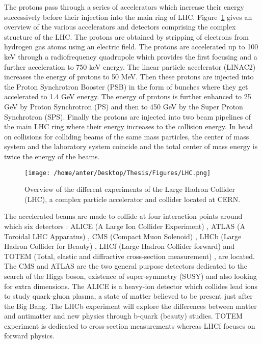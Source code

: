 The protons pass through a series of accelerators which increase their energy successively before their injection into the main ring of LHC. Figure~\ref{fig:LHC} gives an overview of the various accelerators and detectors comprising the complex structure of the LHC. The protons are obtained by stripping of electrons from hydrogen gas atoms using an electric field. The protons are accelerated up to 100 keV through a radiofrequency quadrupole which provides the first focusing and a further acceleration to 750 keV energy. The linear particle accelerator (LINAC2) increases the energy of protons to 50 MeV. Then these protons are injected into the Proton Synchrotron Booster (PSB) in the form of bunches where they get accelerated to 1.4 GeV energy. The energy of protons is further enhanced to 25 GeV by Proton Synchrotron (PS) and then to 450 GeV by the Super Proton Synchrotron (SPS). Finally the protons are injected into two beam pipelines of the main LHC ring where their energy increases to the collision energy. In head on collisions for colliding beams of the same mass particles, the center of mass system and the laboratory system coincide and the total center of mass energy is twice the energy of the beams. 

\begin{figure}[!h]
 \begin{center} 
 \hspace*{-5mm}
 \texttt{[image: /home/anter/Desktop/Thesis/Figures/LHC.png]}\\
 \vspace*{5mm}
 \caption[LHC]{Overview of the different experiments of the Large Hadron Collider (LHC), a complex particle accelerator and collider located at CERN\footnotemark.}
 \label{fig:LHC}
 \end{center}
\end{figure}

The accelerated beams are made to collide at four interaction points around which six detectors : ALICE (A Large Ion Collider Experiment) \cite{Aamodt:2008zz}, ATLAS (A Toroidal LHC Apparatus) \cite{Aad:2008zzm}, CMS (Compact Muon Solenoid) \cite{Chatrchyan:2008aa,Bayatian:2006nff,Ball:2007zza}, LHCb (Large Hadron Collider for Beauty) \cite{Alves:2008zz}, LHCf (Large Hadron Collider forward)\cite{Adriani:2008zz} and TOTEM (Total, elastic and diffractive cross-section measurement) \cite{Anelli:2008zza}, are located. The CMS and ATLAS are the two general purpose detectors dedicated to the search of the Higgs boson, existence of super-symmetry (SUSY) and also looking for extra dimensions. The ALICE is a heavy-ion detector which collides lead ions to study quark-gluon plasma, a state of matter believed to be present just after the Big Bang. The LHCb experiment will explore the differences between matter and antimatter and new physics through b-quark (beauty) studies. TOTEM experiment is dedicated to cross-section measurements whereas LHCf focuses on forward physics. 

